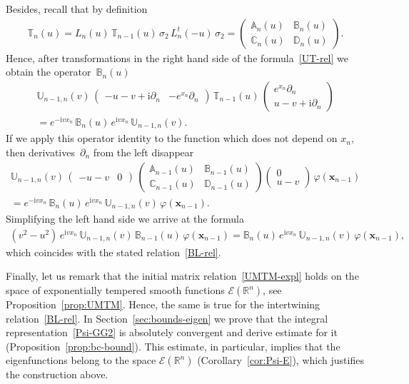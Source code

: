 \documentclass[11pt]{article}
\numberwithin{equation}{section}
\theoremstyle{plain}
\theoremstyle{definition}
\newcommand{\T}{\mathbb{T}}
\newcommand{\A}{\mathbb{A}}
\newcommand{\B}{\mathbb{B}}
\newcommand{\C}{\mathbb{C}}
\newcommand{\D}{\mathbb{D}}
\newcommand{\MMO}{\mathbb{U}}
\renewcommand{\phi}{\varphi}
\renewcommand{\imath}{\mathrm{i}}
\begin{document}
Besides, recall that by definition 
\begin{align}
	\T_n(u) = L_n(u) \, \T_{n - 1}(u) \, \sigma_2 \, L^t_n(-u) \, \sigma_2 = 
	\begin{pmatrix}
		\A_n(u) & \B_n(u) \\[3pt]
		\C_n(u) & \D_n(u)
	\end{pmatrix}.
\end{align}
Hence, after transformations in the right hand side of the formula~\eqref{UT-rel} we obtain the operator~$\B_n(u)$
\begin{multline}
	\MMO_{n-1,n}(v)\,
	\begin{pmatrix} -u-v+\imath\partial_n & -e^{x_n}\partial_n  \end{pmatrix} \,
	\T_{n-1}(u)\,
	\begin{pmatrix}
		e^{x_n}\partial_n \\[3pt]
		u-v+\imath\partial_n \end{pmatrix} \\[6pt]
	= e^{- \imath v x_n} \, \B_n(u) \, e^{\imath v x_n} \, \MMO_{n - 1, n}(v).
\end{multline}
If we apply this operator identity to the function which does not depend on $x_n$, then derivatives~$\partial_n$ from the left disappear 
\begin{multline}
\MMO_{n-1,n}(v)\,
\begin{pmatrix} -u-v & 0 \end{pmatrix} \,
\left(\begin{array}{cc}
\A_{n-1}(u) & \B_{n-1}(u) \\[3pt]
\C_{n-1}(u) & \D_{n-1}(u) \end{array} \right )
\begin{pmatrix} 
0\\[3pt]
u-v \end{pmatrix} \, \phi(\bm{x}_{n-1}) \\[6pt]
= e^{-\imath v x_n}\,\B_n(u)\,e^{\imath v x_n}\,
\MMO_{n-1,n}(v)\,\phi(\bm{x}_{n-1}).
\end{multline}
Simplifying the left hand side we arrive at the formula
\begin{align}
	(v^2 - u^2) \,e^{\imath v x_n}\,\MMO_{n-1,n}(v)\,
	\B_{n-1}(u)\,\phi(\bm{x}_{n-1}) = \B_n(u)\,e^{\imath v x_n}\,\MMO_{n-1,n}(v)\, \phi(\bm{x}_{n-1}),
\end{align}
which coincides with the stated relation~\eqref{BL-rel}.

Finally, let us remark that the initial matrix relation~\eqref{UMTM-expl} holds on the space of exponentially tempered smooth functions $\mathcal{E}(\mathbb{R}^n)$, see Proposition~\ref{prop:UMTM}. Hence, the same is true for the intertwining relation~\eqref{BL-rel}. In Section~\ref{sec:bounds-eigen} we prove that the integral representation~\eqref{Psi-GG2} is absolutely convergent and derive estimate for it (Proposition~\ref{prop:bc-bound}). This estimate, in particular, implies that the eigenfunctions belong to the space $\mathcal{E}(\mathbb{R}^n)$ (Corollary~\ref{cor:Psi-E}), which justifies the construction above. 
\end{document}
